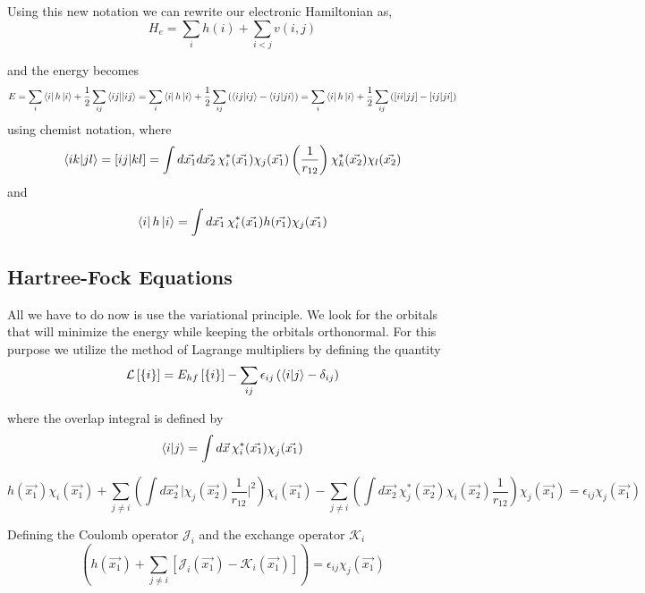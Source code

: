 \documentclass[a4paper]{article}
\begin{document}
Using this new notation we can rewrite our electronic Hamiltonian as,
$$
H_{e} = \sum_i h(i) + \sum_{i<j} v(i,j) 
$$

and the energy becomes
\begin{dmath} \label{H}
E = \sum_i \bra{i}h\ket{i} + \frac{1}{2}\sum_{ij} \braket{ij || ij}
= \sum_i \bra{i}h\ket{i} + \frac{1}{2}\sum_{ij} \left( \braket{ij|ij} - \braket{ij|ji} \right)
= \sum_i \bra{i}h\ket{i} + \frac{1}{2}\sum_{ij} \left( \left[ii|jj\right] - \left[ij|ji\right]\right)
\end{dmath}
using chemist notation, where 
$$
\braket{ik|jl} = \left[ij|kl\right] = \int d\vec{x_1}d\vec{x_2} \, \chi^{*}_{i}(\vec{x_1}) \chi_{j}(\vec{x_1}) \left(\frac{1}{r_{12}}\right) \chi^{*}_{k}(\vec{x_2}) \chi_{l}(\vec{x_2})
$$
and
$$
\bra{i}h\ket{i} = \int d\vec{x_1} \, \chi^{*}_{i} (\vec{x_1}) h(\vec{r_1}) \chi_{j} (\vec{x_1}) 
$$


\subsection{Hartree-Fock Equations}
All we have to do now is use the variational principle. 
We look for the orbitals that will minimize the energy while keeping the orbitals orthonormal.
For this purpose we utilize the method of Lagrange multipliers by defining the quantity
$$
\mathcal{L} \left[ \{ i \}\right] =  E_{hf} \left[\{i\}\right] - \sum_{ij} \epsilon_{ij} \left(\braket{i | j} - \delta_{ij} \right)
$$

where the overlap integral is defined by
$$
\braket{i | j} = \int d\vec{x} \, \chi^{*}_{i} (\vec{x_1}) \chi^{}_{j} (\vec{x_1})
$$

\begin{equation} \label{deriv}
h(\vec{x_1}) \chi^{}_{i} (\vec{x_1}) + 
\sum_{j\neq i} \left( \int d\vec{x_2} \, \big| \chi_{j} (\vec{x_2}) \frac{1}{r_{12}}\big|^2 \right) \chi_{i} (\vec{x_1}) -
\sum_{j\neq i} \left( \int d\vec{x_2} \, \chi^{*}_{j} (\vec{x_2}) \chi_i (\vec{x_2})  \frac{1}{r_{12}} \right) \chi_{j} (\vec{x_1})
= \epsilon_{ij} \chi_{j} (\vec{x_1})
\end{equation}

Defining the Coulomb operator $\mathcal{J}_i$ and the exchange operator $\mathcal{K}_i$
\begin{equation} \label{hf2}
\left( h(\vec{x_1}) + \sum_{j\neq i}\left[ \mathcal{J}_i(\vec{x_1}) - \mathcal{K}_i(\vec{x_1}) \right] \right)
= \epsilon_{ij} \chi_{j} (\vec{x_1})
\end{equation}
\end{document}
